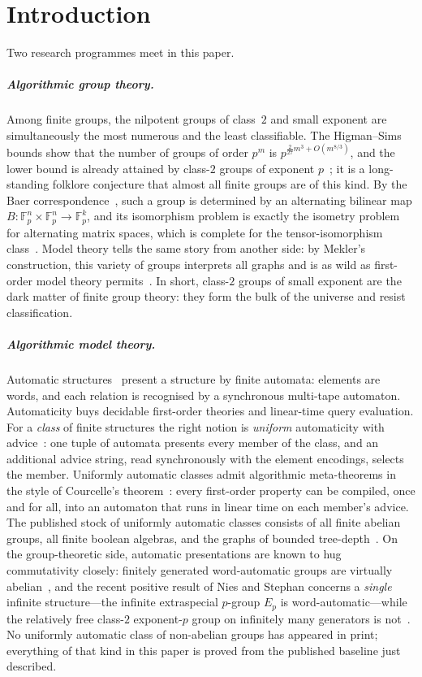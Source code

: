 \documentclass[a4paper,UKenglish,autoref,anonymous]{lipics-v2021}
\newcommand{\Fp}{\mathbb{F}_p}
\begin{document}
\section{Introduction}
\label{sec:intro}

Two research programmes meet in this paper.

\subparagraph*{Algorithmic group theory.}
Among finite groups, the nilpotent groups of class~$2$ and small exponent
are simultaneously the most numerous and the least classifiable. The
Higman--Sims bounds show that the number of groups of order $p^m$ is
$p^{\frac{2}{27}m^3 + O(m^{8/3})}$, and the lower bound is already attained
by class-$2$ groups of exponent $p$~\cite{Higman1960,Sims1965,Pyber1993}; it
is a long-standing folklore conjecture that almost all finite groups are of
this kind. By the Baer correspondence~\cite{Baer1938}, such a group is
determined by an alternating bilinear map $B \colon \Fp^n \times \Fp^n \to
\Fp^k$, and its isomorphism problem is exactly the isometry problem for
alternating matrix spaces, which is complete for the tensor-isomorphism
class~\cite{GrochowQiao2021}. Model theory tells the same story from another
side: by Mekler's construction, this variety of groups interprets all graphs
and is as wild as first-order model theory permits~\cite{Mekler1981}. In
short, class-$2$ groups of small exponent are the dark matter of finite
group theory: they form the bulk of the universe and resist classification.

\subparagraph*{Algorithmic model theory.}
Automatic structures~\cite{KhoussainovNerode1995,BlumensathGraedel2000,Graedel2020}
present a structure by finite automata: elements are words, and each
relation is recognised by a synchronous multi-tape automaton. Automaticity
buys decidable first-order theories and linear-time query evaluation. For a
\emph{class} of finite structures the right notion is \emph{uniform}
automaticity with advice~\cite{AbuZaidGraedelReinhardt2017,AbuZaid2018}: one
tuple of automata presents every member of the class, and an additional
advice string, read synchronously with the element encodings, selects the
member. Uniformly automatic classes admit algorithmic meta-theorems in the
style of Courcelle's theorem~\cite{Courcelle1990}: every first-order
property can be compiled, once and for all, into an automaton that runs in
linear time on each member's advice. The published stock of uniformly
automatic classes consists of all finite abelian groups, all finite boolean
algebras, and the graphs of bounded tree-depth~\cite{AbuZaid2018}. On the
group-theoretic side, automatic presentations are known to hug
commutativity closely: finitely generated word-automatic groups are
virtually abelian~\cite{OliverThomas2005}, and the recent positive result
of Nies and Stephan concerns a \emph{single} infinite structure---the
infinite extraspecial $p$-group $E_p$ is word-automatic---while the
relatively free class-$2$ exponent-$p$ group on infinitely many generators
is not~\cite{NiesStephan2023}. No uniformly automatic class of
non-abelian groups has appeared in print; everything of that kind in this
paper is proved from the published baseline just described.
\end{document}
